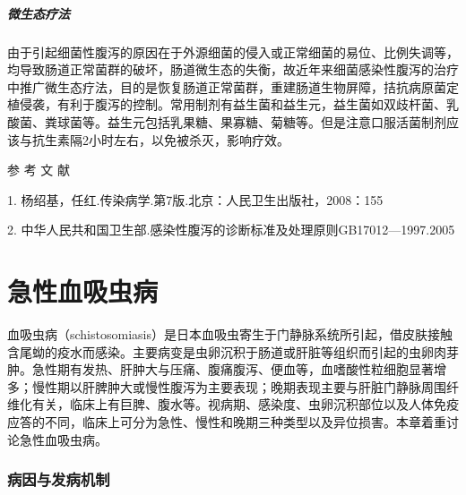 \paragraph{微生态疗法}

由于引起细菌性腹泻的原因在于外源细菌的侵入或正常细菌的易位、比例失调等，均导致肠道正常菌群的破坏，肠道微生态的失衡，故近年来细菌感染性腹泻的治疗中推广微生态疗法，目的是恢复肠道正常菌群，重建肠道生物屏障，拮抗病原菌定植侵袭，有利于腹泻的控制。常用制剂有益生菌和益生元，益生菌如双歧杆菌、乳酸菌、粪球菌等。益生元包括乳果糖、果寡糖、菊糖等。但是注意口服活菌制剂应该与抗生素隔2小时左右，以免被杀灭，影响疗效。

\protect\hypertarget{text00238.html}{}{}

\hypertarget{text00238.htmlux5cux23CHP7-14-4}{}
参 考 文 献

1. 杨绍基，任红.传染病学.第7版.北京：人民卫生出版社，2008：155

2.
中华人民共和国卫生部.感染性腹泻的诊断标准及处理原则GB17012---1997.2005

\protect\hypertarget{text00239.html}{}{}

\chapter{急性血吸虫病}

血吸虫病（schistosomiasis）是日本血吸虫寄生于门静脉系统所引起，借皮肤接触含尾蚴的疫水而感染。主要病变是虫卵沉积于肠道或肝脏等组织而引起的虫卵肉芽肿。急性期有发热、肝肿大与压痛、腹痛腹泻、便血等，血嗜酸性粒细胞显著增多；慢性期以肝脾肿大或慢性腹泻为主要表现；晚期表现主要与肝脏门静脉周围纤维化有关，临床上有巨脾、腹水等。视病期、感染度、虫卵沉积部位以及人体免疫应答的不同，临床上可分为急性、慢性和晚期三种类型以及异位损害。本章着重讨论急性血吸虫病。

\subsection{病因与发病机制}

